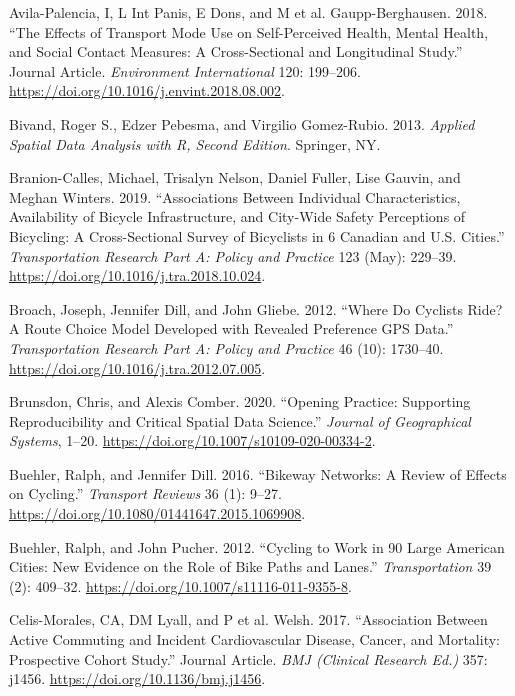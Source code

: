 \documentclass[smallextended]{svjour3}       %
\begin{document}
\leavevmode\hypertarget{ref-Avila2018}{}%
Avila-Palencia, I, L Int Panis, E Dons, and M et al. Gaupp-Berghausen.
2018. ``The Effects of Transport Mode Use on Self-Perceived Health,
Mental Health, and Social Contact Measures: A Cross-Sectional and
Longitudinal Study.'' Journal Article. \emph{Environment International}
120: 199--206. \url{https://doi.org/10.1016/j.envint.2018.08.002}.

\leavevmode\hypertarget{ref-Bivand2013}{}%
Bivand, Roger S., Edzer Pebesma, and Virgilio Gomez-Rubio. 2013.
\emph{Applied Spatial Data Analysis with R, Second Edition}. Springer,
NY.

\leavevmode\hypertarget{ref-Branion2019}{}%
Branion-Calles, Michael, Trisalyn Nelson, Daniel Fuller, Lise Gauvin,
and Meghan Winters. 2019. ``Associations Between Individual
Characteristics, Availability of Bicycle Infrastructure, and City-Wide
Safety Perceptions of Bicycling: A Cross-Sectional Survey of Bicyclists
in 6 Canadian and U.S. Cities.'' \emph{Transportation Research Part A:
Policy and Practice} 123 (May): 229--39.
\url{https://doi.org/10.1016/j.tra.2018.10.024}.

\leavevmode\hypertarget{ref-Broach2012}{}%
Broach, Joseph, Jennifer Dill, and John Gliebe. 2012. ``Where Do
Cyclists Ride? A Route Choice Model Developed with Revealed Preference
GPS Data.'' \emph{Transportation Research Part A: Policy and Practice}
46 (10): 1730--40. \url{https://doi.org/10.1016/j.tra.2012.07.005}.

\leavevmode\hypertarget{ref-brunsdon2020opening}{}%
Brunsdon, Chris, and Alexis Comber. 2020. ``Opening Practice: Supporting
Reproducibility and Critical Spatial Data Science.'' \emph{Journal of
Geographical Systems}, 1--20.
\url{https://doi.org/10.1007/s10109-020-00334-2}.

\leavevmode\hypertarget{ref-Buehler2016}{}%
Buehler, Ralph, and Jennifer Dill. 2016. ``Bikeway Networks: A Review of
Effects on Cycling.'' \emph{Transport Reviews} 36 (1): 9--27.
\url{https://doi.org/10.1080/01441647.2015.1069908}.

\leavevmode\hypertarget{ref-Buehler2012}{}%
Buehler, Ralph, and John Pucher. 2012. ``Cycling to Work in 90 Large
American Cities: New Evidence on the Role of Bike Paths and Lanes.''
\emph{Transportation} 39 (2): 409--32.
\url{https://doi.org/10.1007/s11116-011-9355-8}.

\leavevmode\hypertarget{ref-Celis2017}{}%
Celis-Morales, CA, DM Lyall, and P et al. Welsh. 2017. ``Association
Between Active Commuting and Incident Cardiovascular Disease, Cancer,
and Mortality: Prospective Cohort Study.'' Journal Article. \emph{BMJ
(Clinical Research Ed.)} 357: j1456.
\url{https://doi.org/10.1136/bmj.j1456}.
\end{document}
